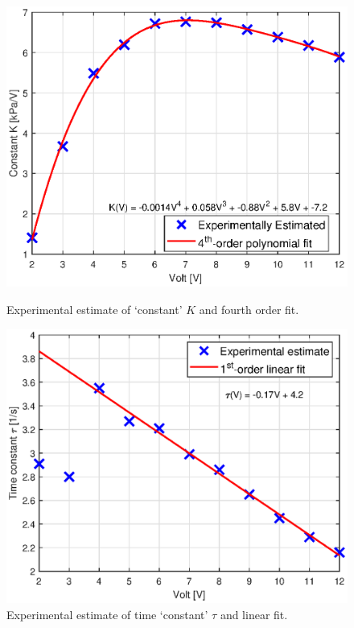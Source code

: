 \begin{figure}[H]
\begin{minipage}[b]{0.48\linewidth}
\centering
\includegraphics[width=\textwidth]{Figures/Chapter3/Kest.eps}
\caption{Experimental estimate of `constant' $K$ and fourth order fit.}
\label{fig3:Kest}
\end{minipage}
\begin{minipage}[b]{0.48\linewidth}
\centering
\includegraphics[width=\textwidth]{Figures/Chapter3/tauest.eps}
\caption{Experimental estimate of time `constant' $\tau$ and linear fit.}
\label{fig3:tauest}
\end{minipage}
\end{figure}

